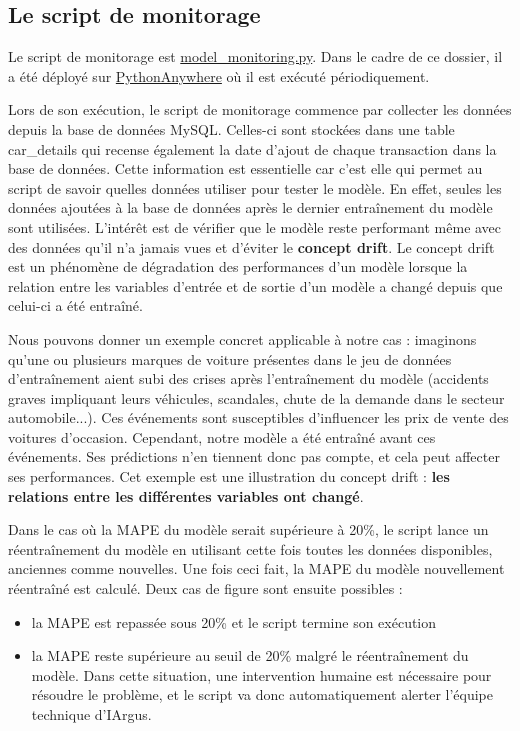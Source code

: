 \documentclass[french]{article}
\begin{document}
    \subsection{Le script de monitorage}

    Le script de monitorage est \href{https://github.com/vinpap/iargus/blob/981ff9fa80fa4b729df37a93b5966d41e86d6966/iargus/model_monitoring.py}{model\_monitoring.py}. Dans le cadre de ce dossier, il a été déployé sur \href{https://www.pythonanywhere.com/}{PythonAnywhere} où il est exécuté périodiquement.

    Lors de son exécution, le script de monitorage commence par collecter les données depuis la base de données MySQL. Celles-ci sont stockées dans une table car\_details qui recense également la date d'ajout de chaque transaction dans la base de données. Cette information est essentielle car c'est elle qui permet au script de savoir quelles données utiliser pour tester le modèle. En effet, seules les données ajoutées à la base de données après le dernier entraînement du modèle sont utilisées. L'intérêt est de vérifier que le modèle reste performant même avec des données qu'il n'a jamais vues et d'éviter le \textbf{concept drift}. Le concept drift est un phénomène de dégradation des performances d'un modèle lorsque la relation entre les variables d'entrée et de sortie d'un modèle a changé depuis que celui-ci a été entraîné. 
    
    Nous pouvons donner un exemple concret applicable à notre cas : imaginons qu'une ou plusieurs marques de voiture présentes dans le jeu de données d'entraînement aient subi des crises après l'entraînement du modèle (accidents graves impliquant leurs véhicules, scandales, chute de la demande dans le secteur automobile...). Ces événements sont susceptibles d'influencer les prix de vente des voitures d'occasion. Cependant, notre modèle a été entraîné avant ces événements. Ses prédictions n'en tiennent donc pas compte, et cela peut affecter ses performances. Cet exemple est une illustration du concept drift : \textbf{les relations entre les différentes variables ont changé}.

    

    Dans le cas où la MAPE du modèle serait supérieure à 20\%, le script lance un réentraînement du modèle en utilisant cette fois toutes les données disponibles, anciennes comme nouvelles. Une fois ceci fait, la MAPE du modèle nouvellement réentraîné est calculé. Deux cas de figure sont ensuite possibles :
    \begin{itemize}
        \item la MAPE est repassée sous 20\% et le script termine son exécution
        \item la MAPE reste supérieure au seuil de 20\% malgré le réentraînement du modèle. Dans cette situation, une intervention humaine est nécessaire pour résoudre le problème, et le script va donc automatiquement alerter l'équipe technique d'IArgus.
    \end{itemize}
\end{document}

